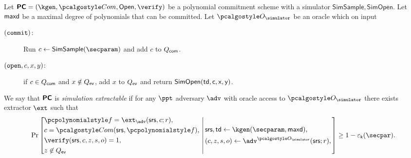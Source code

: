 \documentclass[runningheads,11pt]{llncs}
\begin{document}
\begin{definition}
  \label{def:sepcom}
  Let $\PCOM = (\kgen, \com, \open, \verify)$ be a polynomial commitment
  scheme with a simulator $\mathsf{SimSample}, \mathsf{SimOpen}$. Let $\mathsf{maxd}$ be a maximal degree of polynomials that can be
  committed.
  Let $\oracles$ be an oracle which on input
  \begin{description}
\item[$(\mathtt{commit})$:] Run $c \gets \mathsf{SimSample}(\secparam)$ and add $c$ to $Q_{\mathsf{com}}$.
  \item[$(\mathtt{open}, c, x, y)$:] if $c \in Q_{\mathsf{com}}$ and $x\notin Q_{\mathsf{ev}}$, add $x$ to $Q_{\mathsf{ev}}$ and return $\mathsf{SimOpen(\mathsf{td}, c,x,y)}$.
  \end{description}
  We say that $\bm{\mathsf{PC}}$ is \emph{simulation extractable} if for any $\ppt$
  adversary $\adv$ with oracle access to $\oracles$ there exists extractor
  $\ext$ such that
\[
  \Pr \left[
    \begin{aligned}
      & \p{f} = \ext_\adv(\srs, c; r),\\
      & c = \com(\srs, \p{f}),\\
      & \verify(\srs, c, z, s, o) = 1,\\
      & z \not\in \Qev
    \end{aligned}
    \,\left|\,
      \vphantom{
        \begin{aligned}
          & \\
          & \\
          & \\
          &
        \end{aligned}
        }
    \begin{aligned}
      & \srs,\td \gets \kgen(\secparam, \maxdeg),\\
      & (c, z, s, o) \gets \adv^{\oracles}(\srs; r), \\
    \end{aligned}
  \right.\right]
  \geq 1 - \epsk(\secpar).
\]
\end{definition}
\end{document}
